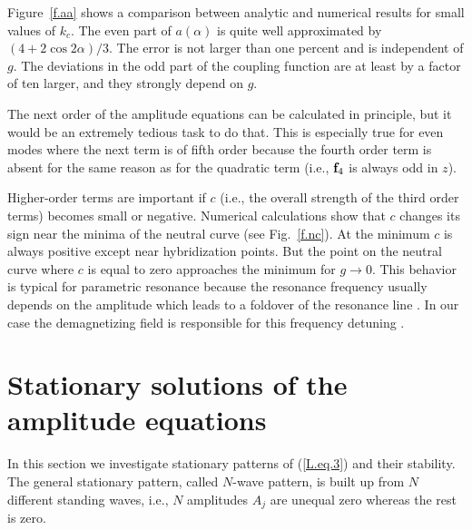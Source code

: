 Figure~\ref{f.aa} shows a comparison between analytic and
numerical results for small values of $k_c$. The even part of
$a(\alpha)$ is quite well approximated by $(4+2\cos 2\alpha)/3$. The
error is not larger than one percent and is independent of $g$.
The deviations in the odd part of the coupling function are at least
by a factor of ten larger, and they strongly depend on $g$. 

The next order of the amplitude equations can be calculated in
principle, 
but it would be an extremely tedious task to do that.  This is
especially true for even modes where the next term is of fifth order
because the fourth order term is absent for the same reason as for
the quadratic term (i.e., ${\bf f}_4$ is always odd in $z$).

Higher-order terms are important if $c$ (i.e., the overall strength 
of the third order terms) becomes small or negative. Numerical
calculations show that $c$ changes its sign near the minima of the
neutral curve (see Fig.~\ref{f.nc}). At the minimum $c$ is always
positive except near hybridization points. But the point on the
neutral curve where $c$ is equal to zero approaches the minimum for
$g\to 0$. This behavior is typical for parametric resonance because
the resonance frequency usually depends on the amplitude which leads
to a foldover of the resonance line \cite{lan.60}. In our case the
demagnetizing field is responsible for this frequency detuning
\cite{rem7}.


\section{\protect\label{SSLEQ}Stationary solutions of the amplitude
equations}

In this section we investigate stationary patterns of (\ref{L.eq.3}) 
and their stability. The general stationary pattern, called $N$-wave
pattern, is built up from $N$ different standing waves, i.e., $N$
amplitudes $A_j$ are unequal zero whereas the rest is zero. 

